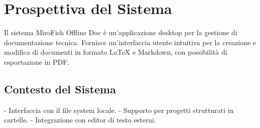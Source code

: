 \section{Prospettiva del Sistema}

Il sistema MiroFish Offline Doc è un'applicazione desktop per la gestione di documentazione tecnica. Fornisce un'interfaccia utente intuitiva per la creazione e modifica di documenti in formato LaTeX e Markdown, con possibilità di esportazione in PDF.

\subsection{Contesto del Sistema}

- Interfaccia con il file system locale.
- Supporto per progetti strutturati in cartelle.
- Integrazione con editor di testo esterni.
